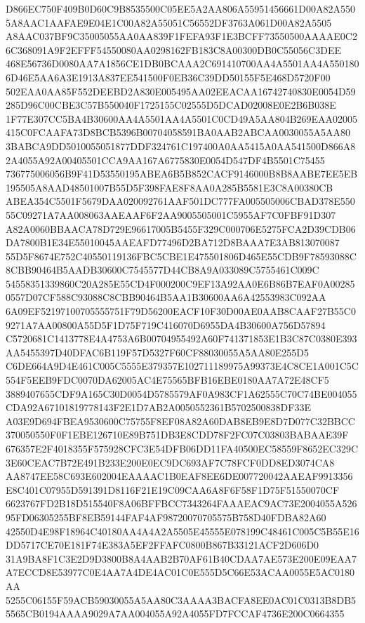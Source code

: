 \documentclass[UTF8,fontset=fandol,zihao=-4,a4paper]{ctexart}
\begin{document}
{{D866EC750F409B0D60C9B8535500C05EE5A2AA806A55951456661D00A82A5505A8AAC1AAFAE9E04E1C00A82A55051C56552DF3763A061D00A82A5505
A8AAC037BF9C35005055AA0AA839F1FEFA93F1E3BCFF73550500AAAAE0C26C368091A9F2EFFF54550080AA0298162FB183C8A00300DB0C55056C3DEE
468E56736D0080AA7A1856CE1DB0BCAAA2C691410700AA4A5501AA4A5501806D46E5AA6A3E1913A837EE541500F0EB36C39DD50155F5E468D5720F00
502EAA0AA85F552DEEBD2A830E005495AA02EEACAA16742740830E0054D59285D96C00CBE3C57B550040F1725155C02555D5DCAD02008E0E2B6B038E
1F77E307CC5BA4B30600AA4A5501AA4A5501C0CD49A5AA804B269EAA02005415C0FCAAFA73D8BCB5396B00704058591BA0AAB2ABCAA0030055A5AA80
3BABCA9DD5010055051877DDF324761C197400A0AA5415A0AA541500D866A82A4055A92A00405501CCA9AA167A6775830E0054D547DF4B5501C75455
736775006056B9F41D53550195ABEA6B5B852CACF9146000B8B8AABE7EE5EB195505A8AAD48501007B55D5F398FAE8F8AA0A285B5581E3C8A00380CB
ABEA354C5501F5679DAA020092761AAF501DC777FA005505006CBAD378E55055C09271A7AA008063AAEAAF6F2AA9005505001C5955AF7C0FBF91D307
A82A0060BBAACA78D729E96617005B5455F329C000706E5275FCA2D39CDB06DA7800B1E34E55010045AAEAFD77496D2BA712D8BAAA7E3AB813070087
55D5F8674E752C40550119136FBC5CBE1E475501806D465E55CDB9F78593088C8CBB90464B5AADB30600C7545577D44CB8A9A033089C5755461C009C
54558351339860C20A285E55CD4F000200C9EF13A92AA0E6B86B7EAF0A002850557D07CF588C93088C8CBB90464B5AA1B30600AA6A42553983C092AA
6A09EF52197100705555751F79D56200EACF10F30D00AE0AAB8CAAF27B55C09271A7AA00800A55D5F1D75F719C416070D6955DA4B30600A756D57894
C5720681C1413778E4A4753A6B00704955492A60F741371853E1B3C87C0380E393AA5455397D40DFAC6B119F57D5327F60CF88030055A5AA80E255D5
C6DE664A9D4E461C005C5555E379357E102711189975A99373E4C8CE1A001C5C554F5EEB9FDC0070DA62005AC4E75565BFB16EBE0180AA7A72E48CF5
3889407655CDF9A165C30D0054D5785579AF0A983CF1A62555C70C74BE004055CDA92A67101819778143F2E1D7AB2A0050552361B5702500838DF33E
A03E9D694FBEA9530600C75755F8EF08A82A60DAB8EB9E8D7D077C32BBCC370050550F0F1EBE126710E89B751DB3E8CDD78F2FC07C03803BABAAE39F
676357E2F4018355F575928CFC3E54DFB06DD11FA40500EC58559F8652EC329C3E60CEAC7B72E491B233E200E0EC9DC693AF7C78FCF0DD8ED3074CA8
AA8747EE58C693E602004EAAAAC1B0EAF8EE6DE007720042AAEAF9913356E8C401C07955D591391D8116F21E19C09CAA6A8F6F58F1D75F51550070CF
6623767FD2B18D515540F8A06BFFBCC7343264FAAAEAC9AC73E2004055A52695FD06305255BF8EB59144FAF4AF98720070705575B758D40FDBA82A60
42550D4E98F18964C40180AA4A4A2A5505E45555E078199C48461C005C5B55E16DD5717CE70E181F74E383A5EF2FFAFC0800B867B33121ACF2D606D0
31A9BA8F1C3E2D9D3800B8A4AAB2B70AF61B40CDAA7AE573E200E09EAA7A7ECCD8E53977C0E4AA7A4DE4AC01C0E555D5C66E53ACAA0055E5AC0180AA
5255C06155F59ACB59030055A5AA80C3AAAA3BACFA8EE0AC01C0313B8DB55565CB0194AAAA9029A7AA004055A92A4055FD7FCCAF4736E200C0664355
}}
\end{document}
